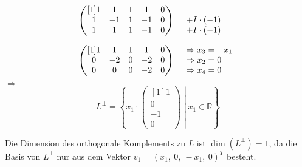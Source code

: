 \documentclass[main.tex]{subfiles}
\begin{document}
\begin{equation*}
    \begin{array}{ r l }
    \begin{pmatrix}[1]
    1 & 1 & 1 & 1 & 0\\
    1 & -1 & 1 & -1 & 0\\
    1 & 1 & 1 & -1 & 0
    \end{pmatrix} & \begin{array}{ l }
    \\
    +I\cdotp ( -1)\\
    +I\cdotp ( -1)
    \end{array}\vspace*{4mm}\\
    \begin{pmatrix}[1]
    1 & 1 & 1 & 1 & 0\\
    0 & -2 & 0 & -2 & 0\\
    0 & 0 & 0 & -2 & 0
    \end{pmatrix} & \begin{array}{ l }
    \Rightarrow x_{3} =-x_{1}\\
    \Rightarrow x_{2} =0\\
    \Rightarrow x_{4} =0
    \end{array}
    \end{array}
\end{equation*}
$\Rightarrow $
\begin{equation*}
    L^{\perp } =\left\{x_{1} \cdotp \begin{pmatrix}[1]
    1\\
    0\\
    -1\\
    0
    \end{pmatrix}\middle| x_{1} \in \mathbb{R}\right\}
\end{equation*}

Die Dimension des orthogonale Komplements zu $L$ ist $\dim\left( L^{\perp }\right) =1$, da die Basis von $L^{\perp }$ nur aus dem Vektor $v_{1} =( x_{1} ,\ 0,\ -x_{1} ,\ 0)^{T}$ besteht.
\end{document}

